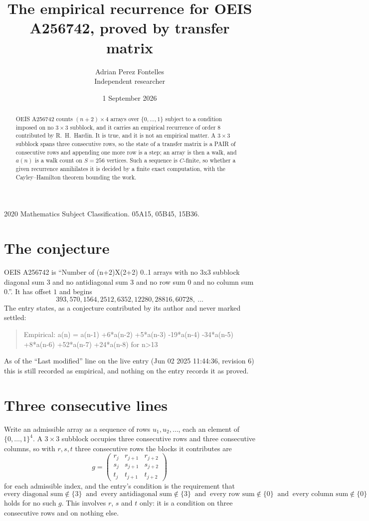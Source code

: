 \documentclass[11pt,a4paper]{article}
\title{The empirical recurrence for OEIS A256742, proved by transfer matrix}
\author{Adrian Perez Fontelles\\ \small Independent researcher}
\date{1 September 2026}
\theoremstyle{plain}
\theoremstyle{definition}
\begin{document}
\maketitle

\begin{abstract}
OEIS A256742 counts $(n+2)\times4$ arrays over $\{0,\dots,1\}$ subject to a condition imposed on
no $3\times3$ subblock, and it carries an empirical recurrence of order $8$
contributed by R.~H.~Hardin. It is true, and it is not an empirical matter. A $3\times3$
subblock spans three consecutive rows, so the state of a transfer matrix is a PAIR of
consecutive rows and appending one more row is a step; an array is then a walk, and
$a(n)$ is a walk count on $S=256$ vertices. Such a sequence is $C$-finite, so whether a given
recurrence annihilates it is decided by a finite exact computation, with the Cayley--Hamilton
theorem bounding the work.
\end{abstract}

\noindent\small 2020 Mathematics Subject Classification. 05A15, 05B45, 15B36.\normalsize

\section{The conjecture}

OEIS A256742 is ``Number of (n+2)X(2+2) 0..1 arrays with no 3x3 subblock diagonal sum 3 and no antidiagonal sum 3 and no row sum 0 and no column sum 0.''. It has offset $1$ and begins
\[
393, 570, 1564, 2512, 6352, 12280, 28816, 60728,\ \dots
\]
The entry states, as a conjecture contributed by its author and never marked settled:
\begin{quote}
Empirical: a(n) = a(n-1) +6*a(n-2) +5*a(n-3) -19*a(n-4) -34*a(n-5) +8*a(n-6) +52*a(n-7) +24*a(n-8) for n>13
\end{quote}
As of the ``Last modified'' line on the live entry (Jun 02 2025 11:44:36, revision 6) this is still
recorded as empirical, and nothing on the entry records it as proved.

\section{Three consecutive lines}

Write an admissible array as a sequence of rows $u_1,u_2,\dots$, each an element of
$\{0,\dots,1\}^{4}$. A $3\times3$ subblock occupies three consecutive rows and
three consecutive columns, so with $r,s,t$ three consecutive rows the blocks it
contributes are
\[
g=\begin{pmatrix}r_j&r_{j+1}&r_{j+2}\\ s_j&s_{j+1}&s_{j+2}\\ t_j&t_{j+1}&t_{j+2}\end{pmatrix}
\]
for each admissible index, and the entry's condition is the requirement that
\[
\text{every diagonal sum} \notin \{3\}\ \text{ and }\ \text{every antidiagonal sum} \notin \{3\}\ \text{ and }\ \text{every row sum} \notin \{0\}\ \text{ and }\ \text{every column sum} \notin \{0\}
\]
holds for no such $g$. This involves $r$, $s$ and $t$ only: it is a condition on
three consecutive rows and on nothing else.
\end{document}
